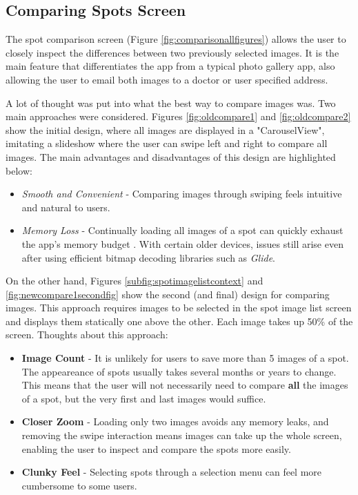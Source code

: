 \subsection{Comparing Spots Screen} \label{CompareScreenDesignSection}

The spot comparison screen (Figure \ref{fig:comparisonallfigures}) allows the user to closely inspect the differences between two previously selected images. It is the main feature that differentiates the app from a typical photo gallery app, also allowing the user to email both images to a doctor or user specified address.

A lot of thought was put into what the best way to compare images was. Two main approaches were considered. Figures \ref{fig:oldcompare1} and \ref{fig:oldcompare2} show the initial design, where all images are displayed in a "CarouselView", imitating a slideshow where the user can swipe left and right to compare all images. The main advantages and disadvantages of this design are highlighted below:
\begin{itemize}
    \item \emph{Smooth and Convenient} - Comparing images through swiping feels intuitive and natural to users.
    \item \emph{Memory Loss} - Continually loading all images of a spot can quickly exhaust the app's memory budget \cite{handlingbitmaps}. With certain older devices, issues still arise even after using efficient bitmap decoding libraries such as \emph{Glide}.
\end{itemize}

On the other hand, Figures \ref{subfig:spotimagelistcontext} and \ref{fig:newcompare1secondfig} show the second (and final) design for comparing images. This approach requires images to be selected in the spot image list screen and displays them statically one above the other. Each image takes up 50\% of the screen. Thoughts about this approach:
\begin{itemize}
    \item \textbf{Image Count} - It is unlikely for users to save more than 5 images of a spot. The appeareance of spots usually takes several months or years to change. This means that the user will not necessarily need to compare \textbf{all} the images of a spot, but the very first and last images would suffice.
    \item \textbf{Closer Zoom} - Loading only two images avoids any memory leaks, and removing the swipe interaction means images can take up the whole screen, enabling the user to inspect and compare the spots more easily.
    \item \textbf{Clunky Feel} - Selecting spots through a selection menu can feel more cumbersome to some users.
\end{itemize}

